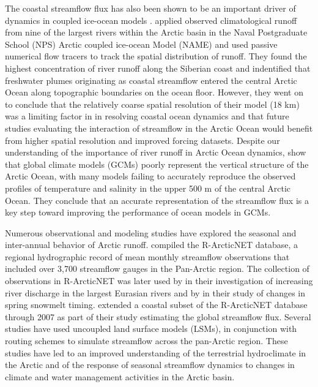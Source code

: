\documentclass[jgrga, draft]{agutex}
\begin{document}
\begin{article}
The coastal streamflow flux has also been shown to be an important driver of dynamics in coupled ice-ocean models \citep[e.g.][]{Newton_2008,Large_2009,Lique_2015}.
\citet{Newton_2008} applied observed climatological runoff from nine of the largest rivers within the Arctic basin in the Naval Postgraduate School (NPS) Arctic coupled ice-ocean Model (NAME) and used passive numerical flow tracers to track the spatial distribution of runoff.
They found the highest concentration of river runoff along the Siberian coast and indentified that freshwater plumes originating as coastal streamflow entered the central Arctic Ocean along topographic boundaries on the ocean floor.
However, they went on to conclude that the relatively coarse spatial resolution of their model (18 km) was a limiting factor in in resolving coastal ocean dynamics and that future studies evaluating the interaction of streamflow in the Arctic Ocean would benefit from higher spatial resolution and improved forcing datasets.
Despite our understanding of the importance of river runoff in Arctic Ocean dynamics, \citet{Nummelin_2015} show that global climate models (GCMs) poorly represent the vertical structure of the Arctic Ocean, with many models failing to accurately reproduce the observed profiles of temperature and salinity in the upper 500 m of the central Arctic Ocean.
They conclude that an accurate representation of the streamflow flux is a key step toward improving the performance of ocean models in GCMs.

Numerous observational and modeling studies have explored the seasonal and inter-annual behavior of Arctic runoff.
\citet{Lammers_2001} compiled the R-ArcticNET database, a regional hydrographic record of mean monthly streamflow observations that included over 3,700 streamflow gauges in the Pan-Arctic region.
The collection of observations in R-ArcticNET was later used by \citet{Shiklomanov_2009} in their investigation of increasing river discharge in the largest Eurasian rivers and by \citet{Tan_2011} in their study of changes in spring snowmelt timing.
\citet{Dai_2009} extended a coastal subset of the R-ArcticNET database through 2007 as part of their study estimating the global streamflow flux.
Several studies \citep{Su_2005,Adam_2007,Slater_2007,Adam_2008,Dai_2009} have used uncoupled land surface models (LSMs), in conjunction with routing schemes to simulate streamflow across the pan-Arctic region.
These studies have led to an improved understanding of the terrestrial hydroclimate in the Arctic and of the response of seasonal streamflow dynamics to changes in climate and water management activities in the Arctic basin.


\end{article}
\end{document}
